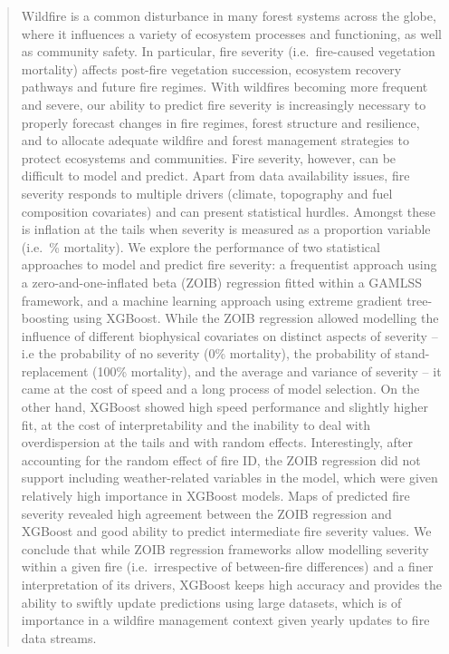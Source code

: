 \documentclass[
  numafflabel,
  authoryear,
  preprint]{elsarticle}
\begin{document}
\begin{frontmatter}
        
\begin{abstract}
Wildfire is a common disturbance in many forest systems across the
globe, where it influences a variety of ecosystem processes and
functioning, as well as community safety. In particular, fire severity
(i.e.~fire-caused vegetation mortality) affects post-fire vegetation
succession, ecosystem recovery pathways and future fire regimes. With
wildfires becoming more frequent and severe, our ability to predict fire
severity is increasingly necessary to properly forecast changes in fire
regimes, forest structure and resilience, and to allocate adequate
wildfire and forest management strategies to protect ecosystems and
communities. Fire severity, however, can be difficult to model and
predict. Apart from data availability issues, fire severity responds to
multiple drivers (climate, topography and fuel composition covariates)
and can present statistical hurdles. Amongst these is inflation at the
tails when severity is measured as a proportion variable (i.e.~\%
mortality). We explore the performance of two statistical approaches to
model and predict fire severity: a frequentist approach using a
zero-and-one-inflated beta (ZOIB) regression fitted within a GAMLSS
framework, and a machine learning approach using extreme gradient
tree-boosting using XGBoost. While the ZOIB regression allowed modelling
the influence of different biophysical covariates on distinct aspects of
severity -- i.e the probability of no severity (0\% mortality), the
probability of stand-replacement (100\% mortality), and the average and
variance of severity -- it came at the cost of speed and a long process
of model selection. On the other hand, XGBoost showed high speed
performance and slightly higher fit, at the cost of interpretability and
the inability to deal with overdispersion at the tails and with random
effects. Interestingly, after accounting for the random effect of fire
ID, the ZOIB regression did not support including weather-related
variables in the model, which were given relatively high importance in
XGBoost models. Maps of predicted fire severity revealed high agreement
between the ZOIB regression and XGBoost and good ability to predict
intermediate fire severity values. We conclude that while ZOIB
regression frameworks allow modelling severity within a given fire
(i.e.~irrespective of between-fire differences) and a finer
interpretation of its drivers, XGBoost keeps high accuracy and provides
the ability to swiftly update predictions using large datasets, which is
of importance in a wildfire management context given yearly updates to
fire data streams.
\end{abstract}





\end{frontmatter}
    
\end{document}
